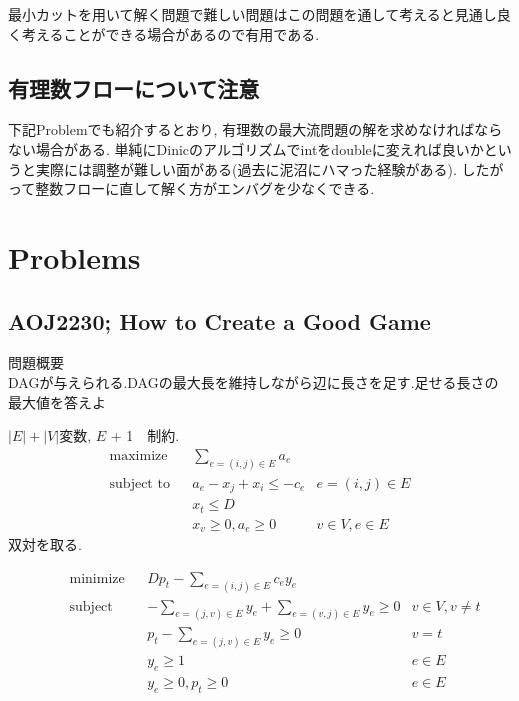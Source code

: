 \documentclass[13pt, a4paper, landscape]{jarticle}
\theoremstyle{nonitalic} %
\begin{document}
最小カットを用いて解く問題で難しい問題はこの問題を通して考えると見通し良く考えることができる場合があるので有用である.



\subsection{有理数フローについて注意}

下記Problemでも紹介するとおり, 有理数の最大流問題の解を求めなければならない場合がある. 単純にDinicのアルゴリズムでintをdoubleに変えれば良いかというと実際には調整が難しい面がある(過去に泥沼にハマった経験がある). したがって整数フローに直して解く方がエンバグを少なくできる.



\section{Problems}

\subsection{AOJ2230; How to Create a Good Game}

問題概要 \\
DAGが与えられる.DAGの最大長を維持しながら辺に長さを足す.足せる長さの最大値を答えよ

$|E|+|V|$変数, $E$ + 1　制約.
\begin{align}
 &&&&&\textrm{maximize}   && \sum_{e = (i,j)\in E} a_e \\
 &&&&&\textrm{subject to} && a_e - x_j + x_i \leq - c_e & e = (i,j) \in E  &&&&&\\
 &&&&&                    && x_t \leq  D &&&&&& \\
 &&&&&                    && x_v \geq 0, a_e \geq 0 & v \in V, e \in E &&&&&
\end{align}
双対を取る.

\begin{align}
  &&&&& \textrm{minimize}   && Dp_t - \sum_{e = (i,j )\in E} c_e y_e \\
  &&&&& \textrm{subject to} && -\sum_{e=(j,v) \in E} y_e + \sum_{e=(v,j) \in E} y_e \geq 0 & v \in V, v\neq t &&&&&\\
  &&&&&                     && p_t - \sum_{e=(j,v) \in E} y_e \geq 0 & v=t \\
  &&&&&                     && y_e \geq 1  & e \in E\\
  &&&&&                     && y_e \geq 0, p_t \geq 0 & e\in E
\end{align}
\end{document}
